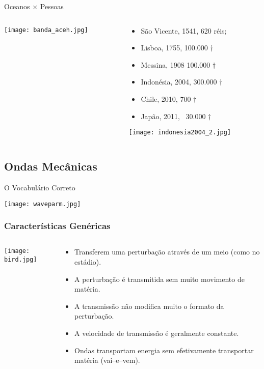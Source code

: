 \documentclass{beamer}
\begin{document}
\begin{frame}{Oceanos $\times$ Pessoas}
  \begin{columns}
    \begin{column}{0.475\textwidth}
      \texttt{[image: banda\_aceh.jpg]}
    \end{column}
    \begin{column}{0.5\textwidth}
      \begin{itemize}\setlength{\itemsep}{1.5ex}
      \item São Vicente, 1541, 620 réis;
      \item Lisboa, 1755, 100.000 $\dagger$
      \item Messina, 1908 100.000 $\dagger$
      \item \alert{Indonésia, 2004, 300.000 $\dagger$}
      \item Chile, 2010, 700 $\dagger$
      \item Japão, 2011, ~30.000 $\dagger$
      \end{itemize}
      \centerline{\texttt{[image: indonesia2004\_2.jpg]}}
    \end{column}
  \end{columns}
\end{frame}
\subsection{Ondas Mecânicas}
\begin{frame}[label=esquema]{O Vocabulário Correto}
  \centerline{\texttt{[image: waveparm.jpg]}}
\end{frame}
\begin{frame}
  \frametitle{Características Genéricas}
  \begin{columns}
    \begin{column}{4cm}   
      \centerline{\texttt{[image: bird.jpg]}}
    \end{column}
    \begin{column}{8cm}
      \begin{itemize}\setlength{\itemsep}{2ex}
      \item Transferem \alert{uma perturbação} através de um meio (como no estádio).
      \item A perturbação é transmitida sem muito movimento de matéria.
      \item A transmissão não modifica muito o formato da perturbação.
      \item A velocidade de transmissão é geralmente constante.
      \item \alert{Ondas transportam energia sem efetivamente
          transportar matéria (vai--e--vem). }
      \end{itemize}
    \end{column}    
  \end{columns}  
\end{frame}
\end{document}
